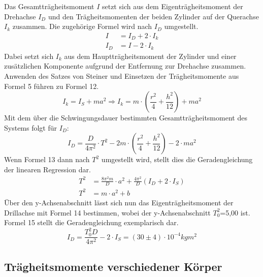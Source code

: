 \documentclass[titlepage = firstcover]{scrartcl}
\begin{document}
      Das Gesamtträgheitsmoment $I$ setzt sich aus dem Eigenträgheitsmoment der Drehachse $I_D$ und den Trägheitsmomenten der beiden Zylinder auf der Querachse 
      $I_k$ zusammen. Die zugehörige Formel wird nach $I_D$ umgestellt.
      \begin{align*}
        I &= I_D + 2 \cdot I_k \\
        I_D &= I -2 \cdot I_k
      \end{align*}
      Dabei setzt sich $I_k$ aus dem Hauptträgheitsmoment der Zylinder und einer zusätzlichen Komponente aufgrund der Entfernung zur Drehachse zusammen.
      Anwenden des Satzes von Steiner und Einsetzen der Trägheitsmomente aus Formel 5 führen zu Formel 12.
      \begin{equation}
        I_k = I_S + ma^2 \Rightarrow I_k = m \cdot (\frac{r^2}{4} + \frac{h^2}{12}) + ma^2
      \end{equation}
      Mit dem über die Schwingungsdauer bestimmten Gesamtträgheitsmoment des Systems folgt für $I_D$:
      \begin{equation}
        I_D = \frac{D}{4\pi^2} \cdot T^2 - 2m \cdot (\frac{r^2}{4} + \frac{h^2}{12}) - 2 \cdot ma^2
      \end{equation}
      Wenn Formel 13 dann nach $T^2$ umgestellt wird, stellt dies die Geradengleichung der linearen Regression dar.
      \begin{align}
        T^2 &= \frac{8\pi^2m}{D} \cdot a^2  + \frac{4\pi^2}{D}(I_D + 2 \cdot I_S) \\
        T^2 &= m \cdot a^2 + b
      \end{align}
      Über den y-Achsenabschnitt lässt sich nun das Eigenträgheitsmoment der Drillachse mit Formel 14 bestimmen, wobei der y-Achsenabschnitt $T_0^2$=5,00 ist.
      Formel 15 stellt die Geradengleichung exemplarisch dar.
      \begin{equation*}
        I_D = \frac{T_0^2D}{4\pi^2} - 2 \cdot I_S = (30 \pm 4) \cdot 10^{-4}kgm^2
      \end{equation*}
      

      \subsection{Trägheitsmomente verschiedener Körper}
      
     
      
\end{document}
